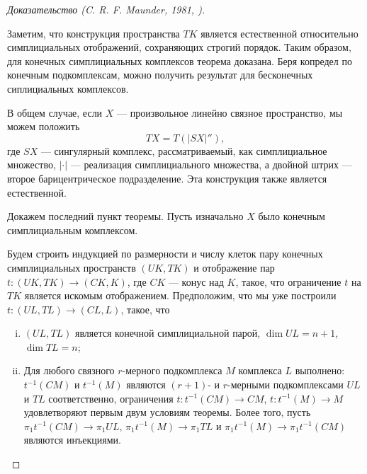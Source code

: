 \documentclass[14pt, dvipsnames]{extarticle}
\theoremstyle{definition}
\theoremstyle{remark}
\begin{document}
\begin{proof}[Доказательство {\normalfont (C. R. F. Maunder, 1981, \cite{Maunder})}]
\begin{enumerate}[\bf 1.]
\end{enumerate}

Заметим, что конструкция пространства $TK$ является естественной относительно симплициальных отображений, сохраняющих строгий порядок. Таким образом, для конечных симплициальных комплексов теорема доказана. Беря копредел по конечным подкомплексам, можно получить результат для бесконечных сиплициальных комплексов.

В общем случае, если $X$ --- произвольное линейно связное пространство, мы можем положить $$TX=T(|SX|''),$$ где $SX$ --- сингулярный комплекс, рассматриваемый, как симплициальное множество, $|\cdot|$ --- реализация симплициального множества, а двойной штрих --- второе барицентрическое подразделение. Эта конструкция также является естественной.

Докажем последний пункт теоремы. Пусть изначально $X$ было конечным симплициальным комплексом. 

Будем строить индукцией по размерности и числу клеток пару конечных симплициальных пространств $(UK, TK)$ и отображение пар $t: (UK, TK) \to (CK, K)$, где $CK$ --- конус над $K$, такое, что ограничение $t$ на $TK$ является искомым отображением. Предположим, что мы уже построили $t: (UL, TL) \to (CL, L)$, такое, что 

\begin{enumerate}[(i)]

\item $(UL, TL)$ является конечной симплициальной парой, $\dim UL = n+1$, $\dim TL = n$;

\item Для любого связного $r$-мерного подкомплекса $M$ комплекса $L$ выполнено: $t^{-1}(CM)$ и $t^{-1}(M)$ являются $(r+1)$- и $r$-мерными подкомплексами $UL$ и  $TL$ соответственно, ограничения $t: t^{-1}(CM)\to CM$, $t: t^{-1}(M)\to M$ удовлетворяют первым двум условиям теоремы. Более того, пусть $\pi_1t^{-1}(CM)\to \pi_1UL$, $\pi_1t^{-1}(M)\to \pi_1TL$ и $\pi_1t^{-1}(M)\to\pi_1t^{-1}(CM)$ являются инъекциями. 

\end{enumerate}    



\end{proof}
\end{document}
